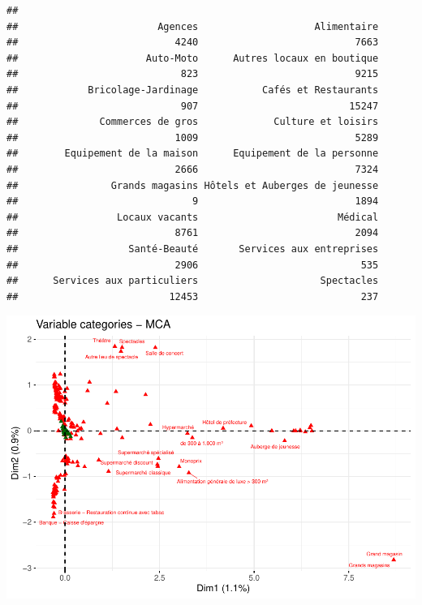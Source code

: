 \documentclass[
]{book}
\newenvironment{Shaded}{\begin{snugshade}}{\end{snugshade}}
\newcommand{\DataTypeTok}[1]{\textcolor[rgb]{0.13,0.29,0.53}{#1}}
\newcommand{\DecValTok}[1]{\textcolor[rgb]{0.00,0.00,0.81}{#1}}
\newcommand{\KeywordTok}[1]{\textcolor[rgb]{0.13,0.29,0.53}{\textbf{#1}}}
\newcommand{\NormalTok}[1]{#1}
\newcommand{\OperatorTok}[1]{\textcolor[rgb]{0.81,0.36,0.00}{\textbf{#1}}}
\newcommand{\OtherTok}[1]{\textcolor[rgb]{0.56,0.35,0.01}{#1}}
\newcommand{\StringTok}[1]{\textcolor[rgb]{0.31,0.60,0.02}{#1}}
\begin{document}
\begin{verbatim}
## 
##                        Agences                    Alimentaire 
##                           4240                           7663 
##                      Auto-Moto      Autres locaux en boutique 
##                            823                           9215 
##            Bricolage-Jardinage           Cafés et Restaurants 
##                            907                          15247 
##              Commerces de gros             Culture et loisirs 
##                           1009                           5289 
##        Equipement de la maison      Equipement de la personne 
##                           2666                           7324 
##                Grands magasins Hôtels et Auberges de jeunesse 
##                              9                           1894 
##                 Locaux vacants                        Médical 
##                           8761                           2094 
##                   Santé-Beauté       Services aux entreprises 
##                           2906                            535 
##      Services aux particuliers                     Spectacles 
##                          12453                            237
\end{verbatim}

\begin{Shaded}
\end{Shaded}

\includegraphics{bookdown-demo_files/figure-latex/0611-1.pdf}
\end{document}
